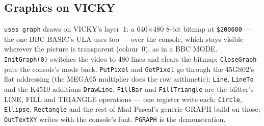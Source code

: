 \subsection*{Graphics on VICKY}
\verb|uses graph| draws on VICKY's layer~1: a 640$\times$480 8-bit bitmap
at \texttt{\$200000} --- the one BBC BASIC's ULA uses too --- over the
console, which stays visible wherever the picture is transparent
(colour~0), as in a BBC MODE. \verb|InitGraph(0)| switches the video to
480 lines and clears the bitmap; \verb|CloseGraph| puts the console's
mode back. \verb|PutPixel| and \verb|GetPixel| go through the 45GS02's
flat addressing (the MEGA65 multiplier does the row arithmetic);
\verb|Line|, \verb|LineTo| and the K4510 additions \verb|DrawLine|,
\verb|FillBar| and \verb|FillTriangle| are the blitter's LINE, FILL and
TRIANGLE operations --- one register write each; \verb|Circle|,
\verb|Ellipse|, \verb|Rectangle| and the rest of Mad Pascal's generic
GRAPH build on those; \verb|OutTextXY| writes with the console's font.
\verb|PGRAPH| is the demonstration.

